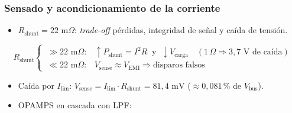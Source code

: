 \begin{frame}
\transdissolve
\frametitle{Sensado y acondicionamiento de la corriente}

\begin{itemize}
  \item $R_\text{shunt} = 22\text{ m}\Omega$: \textit{trade-off} pérdidas, integridad de señal y caída de tensión.
\end{itemize}

\pause
\vspace{-0.2cm}
{\footnotesize
\begin{equation*}
R_\text{shunt}
\begin{cases}
  \ \gg 22\text{ m}\Omega: & \uparrow P_\text{shunt}=I^{2}R \ \text{ y } \ \downarrow V_\text{carga}\quad (1\,\Omega \Rightarrow 3{,}7\text{ V de caída}) \\[3pt]
  \ \ll 22\text{ m}\Omega: & V_\text{sense} \approx  V_\text{EMI} \Rightarrow \text{disparos falsos}
\end{cases}
\end{equation*}
}
\vspace{-0.25cm}

\pause
\begin{itemize}
  \item Caída por $I_\text{lim}$: $V_\text{sense} = I_\text{lim}\cdot R_\text{shunt} = 81{,}4\text{ mV}$ ($\approx 0{,}081$\,\% de $V_\text{bus}$).
  \pause
  \item OPAMPS en cascada con LPF:
\end{itemize}


\end{frame}
